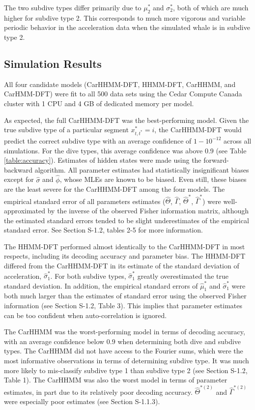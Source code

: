 The two subdive types differ primarily due to $\mu_2^*$ and $\sigma_2^*$, both of which are much higher for subdive type 2. This corresponds to much more vigorous and variable periodic behavior in the acceleration data when the simulated whale is in subdive type 2.

\subsection{Simulation Results}

All four candidate models (CarHHMM-DFT, HHMM-DFT, CarHHMM, and CarHMM-DFT) were fit to all 500 data sets using the Cedar Compute Canada cluster with 1 CPU and 4 GB of dedicated memory per model.

As expected, the full CarHHMM-DFT was the best-performing model. Given the true subdive type of a particular segment $x^*_{t,t^*} = i$, the CarHHMM-DFT would predict the correct subdive type with an average confidence of $1 - 10^{-12}$ across all simulations. For the dive types, this average confidence was above 0.9 (see Table \ref{table:accuracy}). Estimates of hidden states were made using the forward-backward algorithm. All parameter estimates had statistically insignificant biases except for $\hat \sigma$ and $\hat \phi$, whose MLEs are known to be biased. Even still, these biases are the least severe for the CarHHMM-DFT among the four models. The empirical standard error of all parameters estimates ($\hat \Theta$, $\hat \Gamma$, $\hat \Theta^*$, $\hat \Gamma^*$) were well-approximated by the inverse of the observed Fisher information matrix, although the estimated standard errors tended to be slight underestimates of the empirical standard error. See Section S-1.2, tables 2-5 for more information.

The HHMM-DFT performed almost identically to the CarHHMM-DFT in most respects, including its decoding accuracy and parameter bias. The HHMM-DFT differed from the CarHHMM-DFT in its estimate of the standard deviation of acceleration, $\hat \sigma_1^*$. For both subdive types, $\hat \sigma_1^*$ greatly overestimated the true standard deviation. In addition, the empirical standard errors of $\hat \mu_1^*$ and $\hat \sigma_1^*$ were both much larger than the estimates of standard error using the observed Fisher information (see Section S-1.2, Table 3). This implies that parameter estimates can be too confident when auto-correlation is ignored.

The CarHHMM was the worst-performing model in terms of decoding accuracy, with an average confidence below $0.9$ when determining both dive and subdive types. The CarHHMM did not have access to the Fourier sums, which were the most informative observations in terms of determining subdive type. It was much more likely to mis-classify subdive type 1 than subdive type 2 (see Section S-1.2, Table 1). The CarHHMM was also the worst model in terms of parameter estimates, in part due to its relatively poor decoding accuracy. $\hat \Theta^{*(2)}$ and $\hat \Gamma^{*(2)}$ were especially poor estimates (see Section S-1.1.3).

